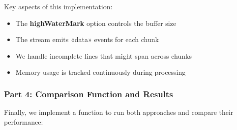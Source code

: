 \documentclass[12pt,letterpaper]{article}
\begin{document}
Key aspects of this implementation:
\begin{itemize}
    \item The \textbf{\textcolor{accentColor}{highWaterMark}} option controls the buffer size
    \item The stream emits «data» events for each chunk
    \item We handle incomplete lines that might span across chunks
    \item Memory usage is tracked continuously during processing
\end{itemize}

\subsubsection{Part 4: Comparison Function and Results}

Finally, we implement a function to run both approaches and compare their performance:
\end{document}
